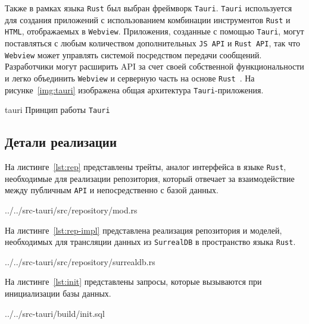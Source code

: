 Также в рамках языка \texttt{Rust} был выбран фреймворк \texttt{Tauri}. 
\texttt{Tauri} используется для создания приложений с использованием комбинации инструментов \texttt{Rust} и \texttt{HTML}, отображаемых в \texttt{Webview}. 
Приложения, созданные с помощью \texttt{Tauri}, могут поставляться с любым количеством дополнительных \texttt{JS API} и \texttt{Rust API}, так что \texttt{Webview} может управлять системой посредством передачи сообщений. 
Разработчики могут расширить API за счет своей собственной функциональности и легко объединить \texttt{Webview} и серверную часть на основе \texttt{Rust}~\cite{tauri}.
На рисунке~\ref{img:tauri} изображена общая архитектура \texttt{Tauri}-приложения.

\img{100mm}
{tauri}
{Принцип работы \texttt{Tauri}}

\subsection{Детали реализации}
На листинге~\ref{lst:rep} представлены трейты, аналог интерфейса в языке \texttt{Rust}, необходимые для реализации репозитория, который отвечает за взаимодействие между публичным \texttt{API} и непосредственно с базой данных.

\begin{lstinputlisting}[
        caption={Трейты, необходимые для реализации репозитория.},
        label={lst:rep},
        language={rust},
        style={rustlang}
    ]{../../src-tauri/src/repository/mod.rs}
\end{lstinputlisting}

На листинге~\ref{lst:rep-impl} представлена реализация репозитория и моделей, необходимых для трансляции данных из \texttt{SurrealDB} в пространство языка \texttt{Rust}.
\begin{lstinputlisting}[
        caption={Реализация репозитория.},
        label={lst:rep-impl},
        style={rustlang},
        language={rust},
        linerange={81-225}
    ]{../../src-tauri/src/repository/surrealdb.rs}
\end{lstinputlisting}

На листинге~\ref{lst:init} представлены запросы, которые вызываются при инициализации базы данных.
\begin{lstinputlisting}[
        caption={Инициализация базы данных.},
        label={lst:init},
        language={rust},
        style={rustlang}
    ]{../../src-tauri/build/init.sql}
\end{lstinputlisting}

